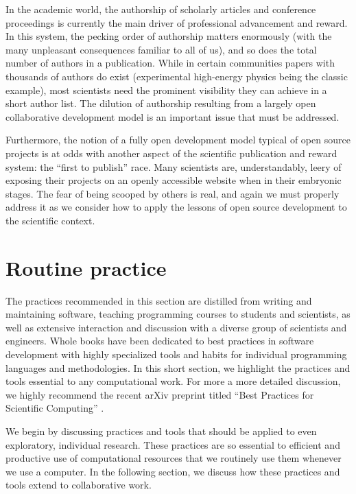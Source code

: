 \documentclass[ChapterTOCs,krantz2]{krantz} %
\begin{document}
In the academic world, the authorship of scholarly articles and conference
proceedings is currently the main driver of professional advancement and
reward. In this system, the pecking order of authorship matters enormously
(with the many unpleasant consequences familiar to all of us), and so does the
total number of authors in a publication. While in certain communities papers
with thousands of authors do exist (experimental high-energy physics being the
classic example), most scientists need the prominent visibility they can
achieve in a short author list. The dilution of authorship resulting from a
largely open collaborative development model is an important issue that must be
addressed.

Furthermore, the notion of a fully open development model typical of open
source projects is at odds with another aspect of the scientific publication
and reward system: the ``first to publish'' race. Many scientists are,
understandably, leery of exposing their projects on an openly accessible
website when in their embryonic stages. The fear of being scooped by others is
real, and again we must properly address it as we consider how to apply the
lessons of open source development to the scientific context.

\section{\label{sec:practice}Routine practice}

The practices recommended in this section are distilled from 
writing and maintaining software, teaching programming courses to
students and scientists, as well as extensive interaction and discussion with a
diverse group of scientists and engineers.  Whole books have been dedicated to
best practices in software development with highly specialized tools and habits
for individual programming languages and methodologies.  In this short section,
we highlight the practices and tools essential to any computational work. For
more a more detailed discussion, we highly recommend the recent arXiv preprint
titled ``Best Practices for Scientific Computing'' \cite{2012arXiv1210.0530A}.

We begin by discussing practices and tools that should be applied to even
exploratory, individual research.  These practices are so essential to
efficient and productive use of computational resources that we routinely use
them whenever we use a computer. In the following section, we discuss how these
practices and tools extend to collaborative work. 
\end{document}
